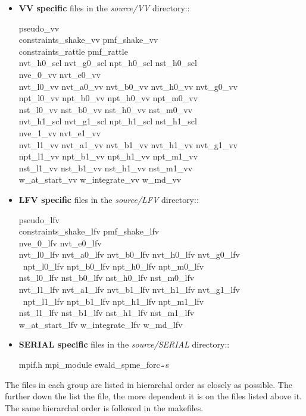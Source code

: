 \begin{itemize}
\item {\bf VV specific} files in the {\em source/VV} directory::

{\sc
pseudo\_vv \\
constraints\_shake\_vv pmf\_shake\_vv \\
constraints\_rattle pmf\_rattle \\
nvt\_h0\_scl nvt\_g0\_scl npt\_h0\_scl nst\_h0\_scl \\
nve\_0\_vv  nvt\_e0\_vv \\
nvt\_l0\_vv nvt\_a0\_vv nvt\_b0\_vv nvt\_h0\_vv nvt\_g0\_vv \\
npt\_l0\_vv npt\_b0\_vv npt\_h0\_vv npt\_m0\_vv \\
nst\_l0\_vv nst\_b0\_vv nst\_h0\_vv nst\_m0\_vv \\
nvt\_h1\_scl nvt\_g1\_scl npt\_h1\_scl nst\_h1\_scl \\
nve\_1\_vv  nvt\_e1\_vv \\
nvt\_l1\_vv nvt\_a1\_vv nvt\_b1\_vv nvt\_h1\_vv nvt\_g1\_vv \\
npt\_l1\_vv npt\_b1\_vv npt\_h1\_vv npt\_m1\_vv \\
nst\_l1\_vv nst\_b1\_vv nst\_h1\_vv nst\_m1\_vv \\
w\_at\_start\_vv w\_integrate\_vv  w\_md\_vv}

\item {\bf LFV specific} files in the {\em source/LFV} directory::

{\sc
pseudo\_lfv \\
constraints\_shake\_lfv pmf\_shake\_lfv \\
nve\_0\_lfv nvt\_e0\_lfv \\
nvt\_l0\_lfv nvt\_a0\_lfv nvt\_b0\_lfv nvt\_h0\_lfv nvt\_g0\_lfv \\\
npt\_l0\_lfv npt\_b0\_lfv npt\_h0\_lfv npt\_m0\_lfv \\
nst\_l0\_lfv nst\_b0\_lfv nst\_h0\_lfv nst\_m0\_lfv \\
nvt\_l1\_lfv nvt\_a1\_lfv nvt\_b1\_lfv nvt\_h1\_lfv nvt\_g1\_lfv \\\
npt\_l1\_lfv npt\_b1\_lfv npt\_h1\_lfv npt\_m1\_lfv \\
nst\_l1\_lfv nst\_b1\_lfv nst\_h1\_lfv nst\_m1\_lfv \\
w\_at\_start\_lfv w\_integrate\_lfv  w\_md\_lfv}

\item {\bf SERIAL specific} files in the {\em source/SERIAL} directory::

{\sc mpif.h mpi\_module ewald\_spme\_forc$_{\verb"~"}$s}

\end{itemize}
The files in each group are listed in hierarchal order as closely
as possible.  The further down the list the file, the more dependent
it is on the files listed above it.  The same hierarchal order is
followed in the \D makefiles.

